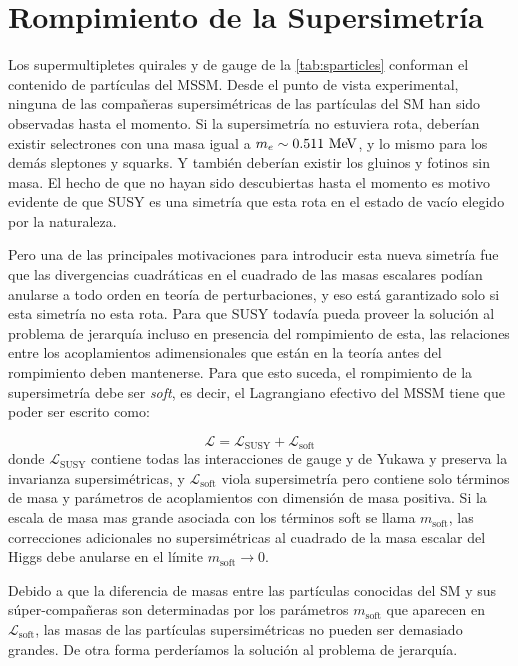 \section{Rompimiento de la Supersimetría}

Los supermultipletes quirales y de gauge de la \cref{tab:sparticles} conforman
el contenido de partículas del MSSM. Desde el punto de vista experimental,
ninguna de las compa\~neras supersimétricas de las partículas del SM han sido
observadas hasta el momento. Si la supersimetría no estuviera rota, deberían
existir selectrones con una masa igual a $m_e \sim 0.511 \mev$, y lo mismo para
los demás sleptones y squarks. Y también deberían existir los gluinos y fotinos
sin masa. El hecho de que no hayan sido descubiertas hasta el momento es motivo
evidente de que SUSY es una simetría que esta rota en el estado de vacío elegido
por la naturaleza.

Pero una de las principales motivaciones para introducir esta nueva simetría fue
que las divergencias cuadráticas en el cuadrado de las masas escalares podían
anularse a todo orden en teoría de perturbaciones, y eso está garantizado solo
si esta simetría no esta rota. Para que SUSY todavía pueda proveer la solución
al problema de jerarquía incluso en presencia del rompimiento de esta, las
relaciones entre los acoplamientos adimensionales que están en la teoría antes
del rompimiento deben mantenerse. Para que esto suceda, el rompimiento de la
supersimetría debe ser \emph{soft}, es decir, el Lagrangiano efectivo del MSSM
tiene que poder ser escrito como:

\begin{equation}
  \mathcal{L} = \mathcal{L}_\text{SUSY} + \mathcal{L}_\text{soft}
\end{equation}
%
donde $\mathcal{L}_\text{SUSY}$ contiene todas las interacciones de gauge y de
Yukawa y preserva la invarianza supersimétricas, y $\mathcal{L}_\text{soft}$
viola supersimetría pero contiene solo términos de masa y parámetros de
acoplamientos con dimensión de masa positiva. Si la escala de masa mas grande
asociada con los términos soft se llama $m_\text{soft}$, las correcciones
adicionales no supersimétricas al cuadrado de la masa escalar del Higgs debe
anularse en el límite $m_\text{soft} \to 0$.

Debido a que la diferencia de masas entre las partículas conocidas del SM y sus
súper-compañeras son determinadas por los parámetros $m_\text{soft}$ que
aparecen en $\mathcal{L}_\text{soft}$, las masas de las partículas
supersimétricas no pueden ser demasiado grandes. De otra forma perderíamos la
solución al problema de jerarquía.


